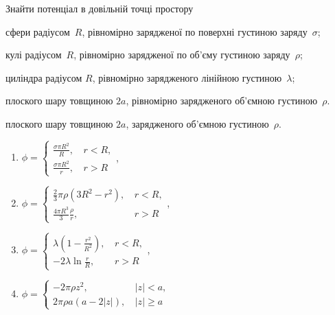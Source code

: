 \begin{problem}
Знайти потенціал  в довільній точці простору
\begin{enumerate*}[label=\alph*)]
	\item сфери радіусом~$R$, рівномірно зарядженої по поверхні густиною заряду~$\sigma$;
	\item кулі радіусом~$R$, рівномірно зарядженої по об'єму густиною заряду~$\rho$;
	\item циліндра радіусом $R$, рівномірно зарядженого лінійною густиною~$\lambda$;
	\item плоского шару товщиною $2a$, рівномірно зарядженого об'ємною густиною~$\rho$.
	\item плоского шару товщиною $2a$, зарядженого об'ємною густиною~$\rho$.
\end{enumerate*}
\begin{solution}
	\begin{enumerate}[label=\alph*)]
		\item $\phi =
		      \begin{cases}
			  \frac{\sigma \pi R^2}{R}, \,    & r < R, \\
			  \frac{\sigma \pi R^2}{r}, \, & r > R
			  \end{cases}
			  $,
		\item $\phi =
			      \begin{cases}
				      \frac23 \pi \rho (3R^2 - r^2), \,    & r < R, \\
				      \frac{4\pi R^3}{3}\frac{\rho}{r}, \, & r > R
			      \end{cases}
		      $,
		\item $\phi =
			      \begin{cases}
				      \lambda \left(1- \frac{r^2}{R^2} \right) ,\, & r < R, \\
				      -2\lambda\ln\frac{r}{R}, \,                  & r > R
			      \end{cases}
		      $,
		\item $\phi =
			      \begin{cases}
				      -2\pi\rho z^2, \,                      & \left| z\right| < a,  \\
				      2\pi\rho a (a - 2\left| z\right| ), \, & \left| z\right| \ge a
			      \end{cases}
		      $
	\end{enumerate}
\end{solution}
\end{problem}

